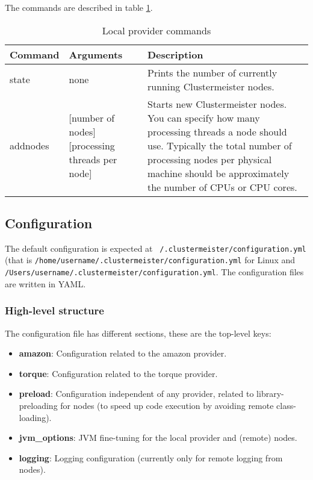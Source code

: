 \documentclass{article}
\begin{document}
The commands are described in table \ref{tab:localprovider}.

\begin{table}[h]
\centering
\begin{tabular}{|l| p{3cm} | p{6cm}|}
\hline
\textbf{Command} & \textbf{Arguments} & \textbf{Description} \\ \hline
state & none & Prints the number of currently running Clustermeister nodes. \\ \hline
addnodes & [number of nodes] [processing threads per node] & Starts new Clustermeister nodes. You can specify how many processing threads a node should use. Typically the total number of processing nodes per physical machine should be approximately the number of CPUs or CPU cores. \\ \hline
\end{tabular}
\caption{Local provider commands}
\label{tab:localprovider}
\end{table}


\subsection{Configuration}

The default configuration is expected at \texttt{~/.clustermeister/configuration.yml} (that is \texttt{/home/username/.clustermeister/configuration.yml} for Linux and \texttt{/Users/username/.clustermeister/configuration.yml}. The configuration files are written in YAML.

\subsubsection{High-level structure}

The configuration file has different sections, these are the top-level keys:

\begin{itemize}
 \item \textbf{amazon}: Configuration related to the amazon provider.
 \item \textbf{torque}: Configuration related to the torque provider.
 \item \textbf{preload}: Configuration independent of any provider, related to library-preloading for nodes (to speed up code execution by avoiding remote class-loading).
 \item \textbf{jvm\_options}: JVM fine-tuning for the local provider and (remote) nodes.
 \item \textbf{logging}: Logging configuration (currently only for remote logging from nodes).
\end{itemize}
\end{document}
